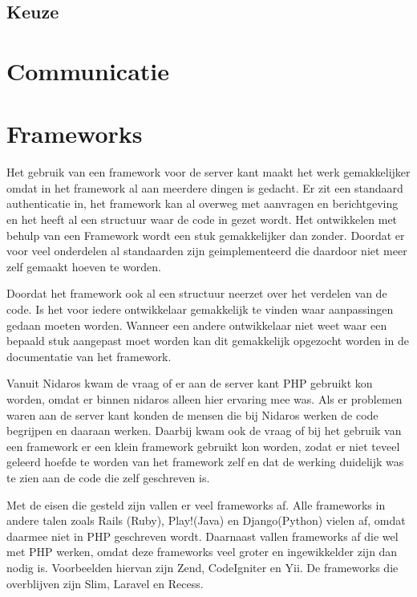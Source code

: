\documentclass[a4paper,11pt,oneside]{report}
\begin{document}
\subsection{Keuze}

\section{Communicatie}

\section{Frameworks}
Het gebruik van een framework voor de server kant maakt het werk gemakkelijker
omdat in het framework al aan meerdere dingen is gedacht. Er zit een standaard
authenticatie in, het framework kan al overweg met aanvragen en berichtgeving en
het heeft al een structuur waar de code in gezet wordt. Het ontwikkelen met
behulp van een Framework wordt een stuk gemakkelijker dan zonder. Doordat er
voor veel onderdelen al standaarden zijn geimplementeerd die daardoor niet meer
zelf gemaakt hoeven te worden.

Doordat het framework ook al een structuur neerzet over het verdelen van de
code. Is het voor iedere ontwikkelaar gemakkelijk te vinden waar aanpassingen
gedaan moeten worden. Wanneer een andere ontwikkelaar niet weet waar een bepaald
stuk aangepast moet worden kan dit gemakkelijk opgezocht worden in de
documentatie van het framework.

Vanuit Nidaros kwam de vraag of er aan de server kant PHP gebruikt kon worden,
omdat er binnen nidaros alleen hier ervaring mee was. Als er problemen waren aan
de server kant konden de mensen die bij Nidaros werken de code begrijpen en
daaraan werken. Daarbij kwam ook de vraag of bij het gebruik van een framework
er een klein framework gebruikt kon worden, zodat er niet teveel geleerd hoefde
te worden van het framework zelf en dat de werking duidelijk was te zien aan de
code die zelf geschreven is.

Met de eisen die gesteld zijn vallen er veel frameworks af. Alle frameworks in
andere talen zoals Rails (Ruby), Play!(Java) en Django(Python) vielen af, omdat
daarmee niet in PHP geschreven wordt. Daarnaast vallen frameworks af die wel met
PHP werken, omdat deze frameworks veel groter en ingewikkelder zijn dan nodig
is. Voorbeelden hiervan zijn Zend, CodeIgniter en Yii. De frameworks die
overblijven zijn Slim, Laravel en Recess.
\newline
\end{document}
